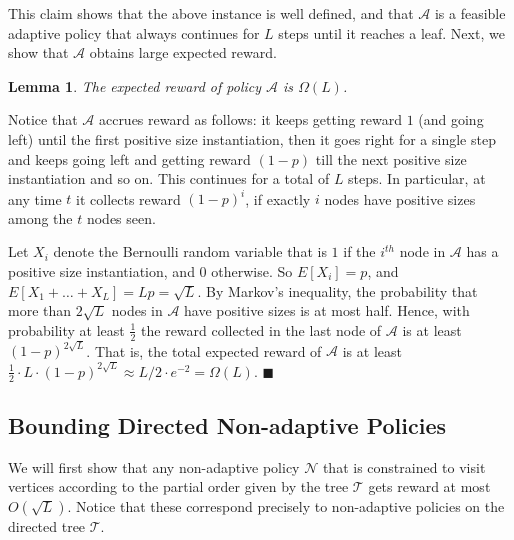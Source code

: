 \documentclass[11pt,letterpaper]{article}
\newtheorem{lemma}[theorem]{Lemma}
\numberwithin{algorithm}{section}
\newenvironment{proof}{

\noindent{\bf Proof:}}
{\hfill$\blacksquare$


}
\newcommand{\A}[0]{{\ensuremath{\mathcal{A}}}\xspace}
\newcommand{\N}[0]{{\ensuremath{\mathcal{N}}}\xspace}
\newcommand{\T}{\ensuremath{\mathcal{T}}\xspace}
\begin{document}
This claim shows that the above instance is well defined, and that  \A is a feasible adaptive policy that always continues for $L$ steps until it reaches a leaf. Next, we show that \A obtains large expected reward.

\begin{lemma}\label{lem:ad-profit}
The expected reward of policy \A is $\Omega(L)$.
\end{lemma}
\begin{proof}
Notice that \A accrues reward as follows: it keeps getting reward $1$ (and going left) until the first positive size instantiation, then it goes right for a single step and keeps going left and getting reward $(1-p)$ till the next positive size instantiation and so on. This continues  for a total of $L$ steps.
In particular, at any time $t$ it collects reward $(1-p)^i$, if exactly $i$ nodes have positive sizes among the $t$ nodes seen.

Let $X_i$ denote the Bernoulli random variable that is $1$ if the $i^{th}$ node in \A has a positive size instantiation, and $0$ otherwise. So $E[X_i]=p$, and
$E[X_1 + \ldots + X_L] = L p = \sqrt{L}$. By Markov's inequality, the probability that more than $2\sqrt{L}$
nodes in \A have positive sizes is at most half. Hence, with probability at least $\frac12$ the reward collected in the last node of \A is at least $(1-p)^{2 \sqrt{L}}$. That is, the total expected reward of \A is at least $\frac12\cdot L \cdot (1-p)^{2 \sqrt{L}} \approx L/2 \cdot e^{-2} =  \Omega(L)$.
\end{proof}

\subsection{Bounding Directed Non-adaptive Policies}\label{subsec:dir-gap}
We will first show that any non-adaptive policy \N
that is constrained to visit vertices according to the partial order given by the tree \T
gets reward at most $O(\sqrt{L})$. 
Notice that these correspond precisely to non-adaptive policies on the directed tree \T.
\end{document}
